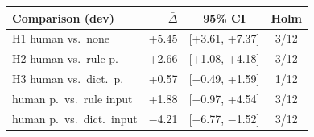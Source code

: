 \begin{tabular}{lrc c}
\toprule
Comparison (dev) & $\bar\Delta$ & 95\% CI & Holm \\
\midrule
H1 human vs.\ none & +5.45 & [+3.61, +7.37] & 3/12 \\
H2 human vs.\ rule p. & +2.66 & [+1.08, +4.18] & 3/12 \\
H3 human vs.\ dict.\ p. & +0.57 & [$-$0.49, +1.59] & 1/12 \\
human p.\ vs.\ rule input & +1.88 & [$-$0.97, +4.54] & 3/12 \\
human p.\ vs.\ dict.\ input & $-$4.21 & [$-$6.77, $-$1.52] & 3/12 \\
\bottomrule
\end{tabular}
